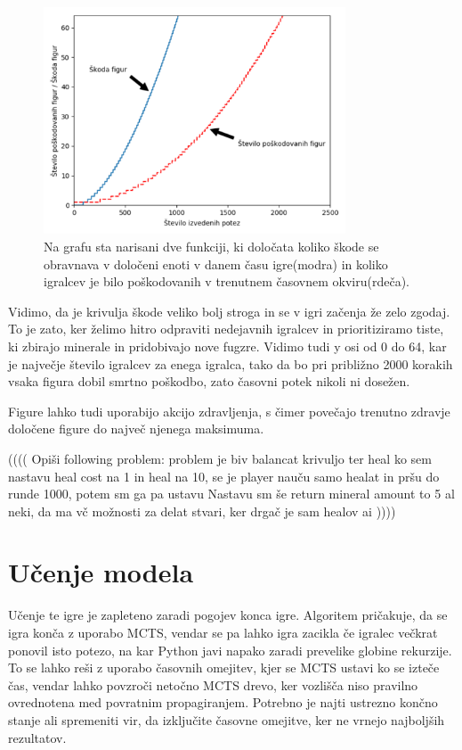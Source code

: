 \documentclass[a4paper, 12pt]{book}
\begin{document}
\begin{figure}[h]
	\begin{center}
		\includegraphics[width=0.8\textwidth]{destroy_formula_2018_10_20.pdf}
	\end{center}
	\caption{Na grafu sta narisani dve funkciji, ki določata koliko škode se obravnava v določeni enoti v danem času igre(modra) in koliko igralcev je bilo poškodovanih v trenutnem časovnem okviru(rdeča).}
	\label{destroy_formula_2018_10_20}
\end{figure}


Vidimo, da je krivulja škode veliko bolj stroga in se v igri začenja že zelo zgodaj. To je zato, ker želimo hitro odpraviti nedejavnih igralcev in prioritiziramo tiste, ki zbirajo minerale in pridobivajo nove fugzre. Vidimo tudi y osi od 0 do 64, kar je največje število igralcev za enega igralca, tako da bo pri približno 2000 korakih vsaka figura dobil smrtno poškodbo, zato časovni potek nikoli ni dosežen.

Figure lahko tudi uporabijo akcijo zdravljenja, s čimer povečajo trenutno zdravje določene figure do največ njenega maksimuma.

(((( Opiši following problem:
	problem je biv balancat krivuljo ter heal
	ko sem nastavu heal cost na 1 in heal na 10, se je player nauču samo healat in pršu do runde 1000, potem sm ga pa ustavu
	Nastavu sm še return mineral amount to 5 al neki, da ma vč možnosti za delat stvari, ker drgač je sam healov ai
	))))

\chapter{Učenje modela}
\label{chucenjemodela}

Učenje te igre je zapleteno zaradi pogojev konca igre. Algoritem pričakuje, da se igra konča z uporabo MCTS, vendar se pa lahko igra zacikla če igralec večkrat ponovil isto potezo, na kar Python javi napako zaradi prevelike globine rekurzije.
To se lahko reši z uporabo časovnih omejitev, kjer se MCTS ustavi ko se izteče čas, vendar lahko povzroči netočno MCTS drevo, ker vozlišča niso pravilno ovrednotena med povratnim propagiranjem.
Potrebno je najti ustrezno končno stanje ali spremeniti vir, da izključite časovne omejitve, ker ne vrnejo najboljših rezultatov.
\end{document}
